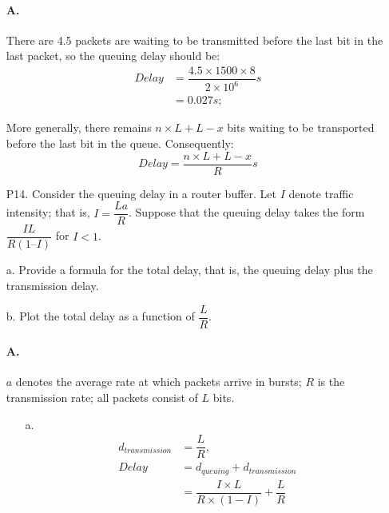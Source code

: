 \documentclass[]{article}
\begin{document}
\begin{enumerate}
	\paragraph{A.}
	There are 4.5 packets are waiting to be transmitted before the last bit in the last packet, so the queuing delay should be:
	\begin{equation}
		\begin{split}
			Delay & = \dfrac{4.5 \times 1500 \times 8}{2 \times 10^{6}}s \\ & = 0.027 s;
		\end{split}
	\end{equation}
		
		More generally, there remains $n \times L + L - x$ bits waiting to be transported before the last bit in the queue. Consequently:
	\[
		Delay = \dfrac{n \times L + L - x}{R} s
	\]	 
	
	\item[P14.]
	Consider the queuing delay in a router buffer. Let $ I $ denote traffic intensity;
	that is, $ I = \dfrac{La}{R} $. Suppose that the queuing delay takes the form $ \dfrac{IL}{R (1 – I)} $
	for $ I < 1 $.
	
	a. Provide a formula for the total delay, that is, the queuing delay plus the
	transmission delay.
	
	b. Plot the total delay as a function of $\dfrac{L}{R}$.
	
	\paragraph{A.}
	$a$ denotes the average rate at which packets arrive in bursts; $R$ is the transmission rate; all packets consist of $L$ bits.
	\begin{enumerate}
		\item[a.]
		\begin{equation}
			\begin{split}
				d_{transmission} & = \dfrac{L}{R}, \\
				Delay & = d_{queuing} + d_{transmission} \\ & = \dfrac{I \times L}{R \times (1 - I)} + \dfrac{L}{R}
			\end{split}
		\end{equation}
			

\end{enumerate}
\end{enumerate}
\end{document}
